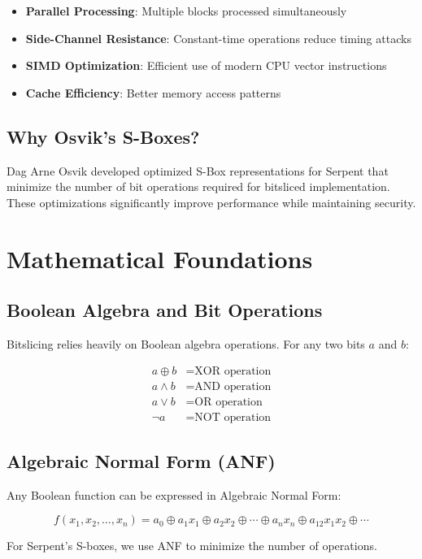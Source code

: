 \documentclass[12pt,a4paper]{article}
\begin{document}
\begin{itemize}
    \item \textbf{Parallel Processing}: Multiple blocks processed simultaneously
    \item \textbf{Side-Channel Resistance}: Constant-time operations reduce timing attacks
    \item \textbf{SIMD Optimization}: Efficient use of modern CPU vector instructions
    \item \textbf{Cache Efficiency}: Better memory access patterns
\end{itemize}

\subsection{Why Osvik's S-Boxes?}
Dag Arne Osvik developed optimized S-Box representations for Serpent that minimize the number of bit operations required for bitsliced implementation. These optimizations significantly improve performance while maintaining security.

\section{Mathematical Foundations}

\subsection{Boolean Algebra and Bit Operations}
Bitslicing relies heavily on Boolean algebra operations. For any two bits $a$ and $b$:

\begin{align}
a \oplus b &= \text{XOR operation} \\
a \land b &= \text{AND operation} \\
a \lor b &= \text{OR operation} \\
\neg a &= \text{NOT operation}
\end{align}

\subsection{Algebraic Normal Form (ANF)}
Any Boolean function can be expressed in Algebraic Normal Form:

$$f(x_1, x_2, \ldots, x_n) = a_0 \oplus a_1 x_1 \oplus a_2 x_2 \oplus \cdots \oplus a_n x_n \oplus a_{12} x_1 x_2 \oplus \cdots$$

For Serpent's S-boxes, we use ANF to minimize the number of operations.
\end{document}
